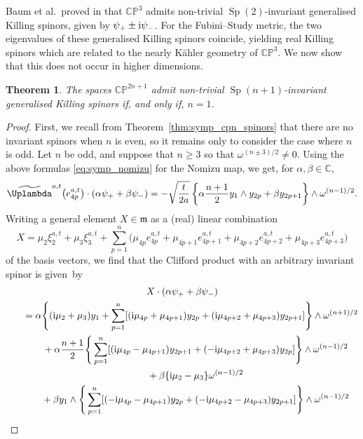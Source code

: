 \documentclass[pdftex]{sigma}
\numberwithin{equation}{section}
\newtheorem{Theorem}{Theorem}[section]
\newcommand{\C}{\mathbb{C}} %
\DeclareMathOperator{\Sp}{Sp}
\begin{document}
		Baum et al.\ proved in \cite[p.\ 146]{BFGK} that $\mathbb{CP}^3$ admits non-trivial $\Sp(2)$-invariant generalised Killing spinors, given by $\psi_{+} \pm {\rm i} \psi_{-}$. For the Fubini--Study metric, the two eigenvalues of these generalised Killing spinors coincide, yielding real Killing spinors which are related to the nearly K\"{a}hler geometry of $\mathbb{CP}^3$. We now show that this does not occur in higher dimensions.
		\begin{Theorem}
			The spaces $\mathbb{CP}^{2n+1}$ admit non-trivial $\Sp(n+1)$-invariant generalised Killing spinors if, and only if, $n=1$.
		\end{Theorem}
		\begin{proof}
			First, we recall from Theorem~\ref{thm:symp_cpn_spinors} that there are no invariant spinors when $n$ is even, so it remains only to consider the case where $n$ is odd. Let $n$ be odd, and suppose that $n \geq 3$ so that $\omega^{(n \pm 3)/2} \neq 0$. Using the above formulas \eqref{eq:symp_nomizu} for the Nomizu map, we get, for $\alpha, \beta \in \C$,
			\[
			\widetilde{\Uplambda}^{a,t} \bigl( e_{4p}^{a,t} \bigr) \cdot ( \alpha \psi_+ + \beta \psi_- ) = -\sqrt{\frac{t}{2a}} \left\{ \alpha \frac{n+1}{2} y_1 \wedge y_{2p} + \beta y_{2p+1} \right\} \wedge \omega^{(n-1)/2} .
			\]
			Writing a general element $X \in \mathfrak{m}$ as a (real) linear combination
			\[ X = \mu_2 \xi_2^{a,t} + \mu_3 \xi_3^{a,t} + \sum_{p=1}^n \bigl( \mu_{4p} e_{4p}^{a,t} + \mu_{4p+1} e_{4p+1}^{a,t} + \mu_{4p+2} e_{4p+2}^{a,t} + \mu_{4p+3} e_{4p+3}^{a,t} \bigr) \]
			of the basis vectors, we find that the Clifford product with an arbitrary invariant spinor is given~by
			\begin{gather*}
				X \cdot ( \alpha \psi_+ + \beta \psi_- ) \\
				\qquad= \alpha \Bigg\{ ({\rm i} \mu_2 + \mu_3) y_1 + \sum_{p=1}^n[ ({\rm i} \mu_{4p} + \mu_{4p+1}) y_{2p} + ({\rm i} \mu_{4p+2}+\mu_{4p+3}) y_{2p+1} ]\Bigg\} \wedge \omega^{(n+1)/2} \\
				\phantom{\qquad=}{}+ \alpha \frac{n+1}{2} \Bigg\{ \sum_{p=1}^n[({\rm i} \mu_{4p} - \mu_{4p+1}) y_{2p+1} + (-{\rm i} \mu_{4p+2}+\mu_{4p+3}) y_{2p} ] \Bigg\} \wedge \omega^{(n-1)/2} \\
				\phantom{\qquad=}{}+ \beta \{ {\rm i} \mu_2 - \mu_3 \} \omega^{(n-1)/2} \\
				\phantom{\qquad=}{}+ \beta y_1 \wedge \Bigg\{ \sum_{p=1}^n[(-{\rm i} \mu_{4p} - \mu_{4p+1}) y_{2p} + (-{\rm i} \mu_{4p+2}-\mu_{4p+3}) y_{2p+1} ] \Bigg\} \wedge \omega^{(n-1)/2} \\

\end{gather*}
\end{proof}
\end{document}
